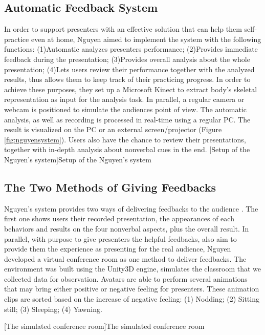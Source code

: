 \subsection*{Automatic Feedback System}
\par In order to support presenters with an effective solution that can help them self-practice even at home, Nguyen aimed to implement the system with the following functions: (1)Automatic analyzes presenters performance; (2)Provides immediate feedback during the presentation; (3)Provides overall analysis about the whole presentation; (4)Lets users review their performance together with the analyzed results, thus allows them to keep track of their practicing progress. In order to achieve these purposes, they set up a Microsoft Kinect to extract body's skeletal representation as input for the analysis task. In parallel, a regular camera or webcam is positioned to simulate the audiences point of view. The automatic analysis, as well as recording is processed in real-time using a regular PC. The result is visualized on the PC or an external screen/projector (Figure \ref{fig:nguyensystem}). Users also have the chance to review their presentations, together with in-depth analysis about nonverbal cues in the end.
[Setup of the Nguyen's system]{Setup of the Nguyen's system \cite{nguyen2015intelligent}}

\subsection*{The Two Methods of Giving Feedbacks}
\par Nguyen's system provides two ways of delivering feedbacks to the audience \cite{nguyen2015intelligent}. The first one shows users their recorded presentation, the appearances of each behaviors and results on the four nonverbal aspects, plus the overall result. In parallel, with purpose to give presenters the helpful feedbacks, also aim to provide them the experience as presenting for the real audience, Nguyen developed a virtual conference room as one method to deliver feedbacks. The environment was built using the Unity3D engine, simulates the classroom that we collected data for observation. Avatars are able to perform several animations that may bring either positive or negative feeling for presenters. These animation clips are sorted based on the increase of negative feeling: (1) Nodding; (2) Sitting still; (3) Sleeping; (4) Yawning.


[The simulated conference room]{The simulated conference room \cite{nguyen2015intelligent}}
